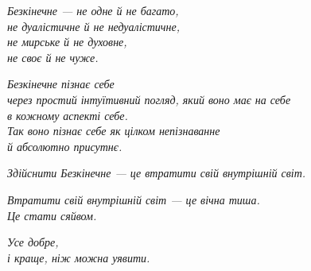 \begin{center}\itshape
Безкінечне — не одне й не багато,\\
не дуалістичне й не недуалістичне,\\
не мирське й не духовне,\\
не своє й не чуже.
\end{center}

\begin{center}\itshape
Безкінечне пізнає себе\\
через простий інтуїтивний погляд, який воно має на себе\\
в кожному аспекті себе.\\
Так воно пізнає себе як цілком непізнаванне\\
й абсолютно присутнє.
\end{center}

\begin{center}\itshape
Здійснити Безкінечне — це втратити свій внутрішній світ.
\end{center}

\begin{center}\itshape
Втратити свій внутрішній світ — це вічна тиша.\\
Це стати сяйвом.
\end{center}

\begin{center}\itshape
Усе добре,\\
і краще, ніж можна уявити.
\end{center}

